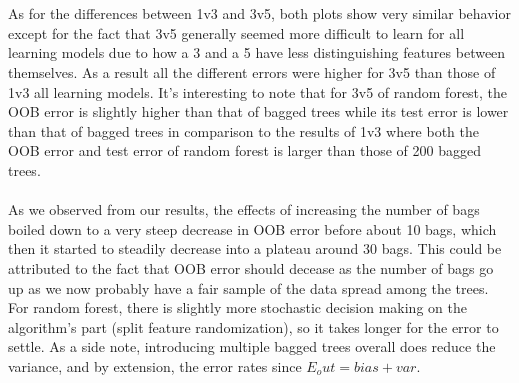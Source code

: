 \documentclass[12pt,letterpaper]{article}
\begin{document}
\begin{description}
	\\\\As for the differences between 1v3 and 3v5, both plots show very similar behavior except for the fact that 3v5 generally seemed more difficult to learn for all learning models due to how a 3 and a 5 have less distinguishing features between themselves. As a result all the different errors were higher for 3v5 than those of 1v3 all learning models. It's interesting to note that for 3v5 of random forest, the OOB error is slightly higher than that of bagged trees while its test error is lower than that of bagged trees in comparison to the results of 1v3 where both the OOB error and test error of random forest is larger than those of 200 bagged trees. 
	\\\\As we observed from our results, the effects of increasing the number of bags boiled down to a very steep decrease in OOB error before about 10 bags, which then it started to steadily decrease into a plateau around 30 bags. This could be attributed to the fact that OOB error should decease as the number of bags go up as we now probably have a fair sample of the data spread among the trees. For random forest, there is slightly more stochastic decision making on the algorithm's part (split feature randomization), so it takes longer for the error to settle. As a side note, introducing multiple bagged trees overall does reduce the variance, and by extension, the error rates since $E_out = bias + var$.

\end{description}
\end{document}
